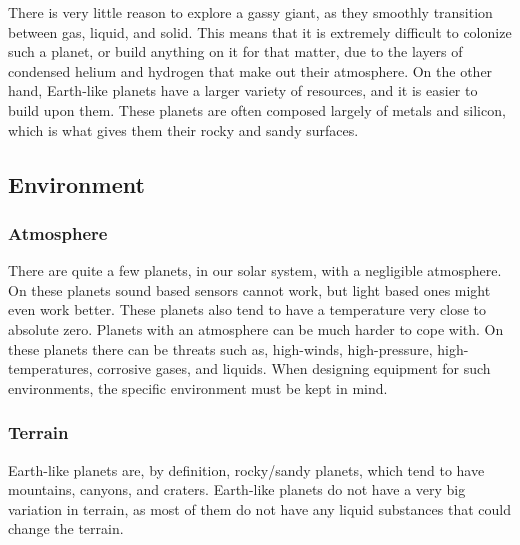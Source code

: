 There is very little reason to explore a gassy giant, as they smoothly transition between gas, liquid, and solid. This means that it is extremely difficult to colonize such a planet, or build anything on it for that matter, due to the layers of condensed helium and hydrogen that make out their atmosphere\cite{outerplanetatmosphere}.
On the other hand, Earth-like planets have a larger variety of resources, and it is easier to build upon them. These planets are often composed largely of metals and silicon, which is what gives them their rocky and sandy surfaces.

\subsection{Environment}
\subsubsection{Atmosphere}
There are quite a few planets, in our solar system, with a negligible atmosphere. On these planets sound based sensors cannot work, but light based ones might even work better. These planets also tend to have a temperature very close to absolute zero\cite{planetstemp}.
Planets with an atmosphere can be much harder to cope with. On these planets there can be threats such as, high-winds, high-pressure, high-temperatures, corrosive gases, and liquids. When designing equipment for such environments, the specific environment must be kept in mind.

\subsubsection{Terrain}
Earth-like planets are, by definition, rocky/sandy planets, which tend to have mountains, canyons, and craters.
Earth-like planets do not have a very big variation in terrain, as most of them do not have any liquid substances that could change the terrain.